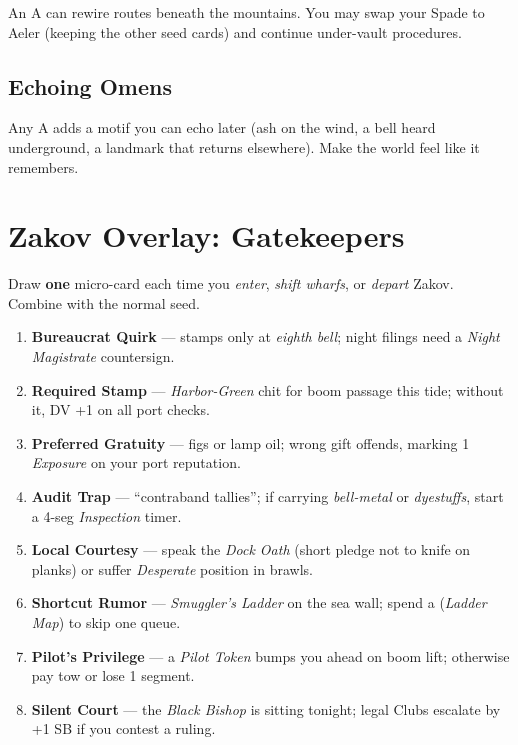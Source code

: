 \documentclass[11pt,letterpaper,twoside]{book}
\begin{document}
An A can rewire routes beneath the mountains. You may swap your Spade to Aeler (keeping the other seed cards) and continue under-vault procedures.

\subsection{Echoing Omens}

Any A adds a motif you can echo later (ash on the wind, a bell heard underground, a landmark that returns elsewhere). Make the world feel like it remembers.

\section{Zakov Overlay: Gatekeepers}

Draw \textbf{one} micro-card each time you \emph{enter}, \emph{shift wharfs}, or \emph{depart} Zakov. Combine with the normal seed.

\begin{tcolorbox}[enhanced,breakable,sharp corners,boxrule=.6pt,title={\textbf{Zakov Gatekeepers Micro-Cards (draw 1)}}]
\begin{enumerate}[label=\arabic*.]
  \item \textbf{Bureaucrat Quirk} --- stamps only at \emph{eighth bell}; night filings need a \emph{Night Magistrate} countersign.
  \item \textbf{Required Stamp} --- \emph{Harbor-Green} chit for boom passage this tide; without it, DV +1 on all port checks.
  \item \textbf{Preferred Gratuity} --- figs or lamp oil; wrong gift offends, marking 1 \emph{Exposure} on your port reputation.
  \item \textbf{Audit Trap} --- ``contraband tallies''; if carrying \emph{bell-metal} or \emph{dyestuffs}, start a 4-seg \emph{Inspection} timer.
  \item \textbf{Local Courtesy} --- speak the \emph{Dock Oath} (short pledge not to knife on planks) or suffer \emph{Desperate} position in brawls.
  \item \textbf{Shortcut Rumor} --- \emph{Smuggler's Ladder} on the sea wall; spend a \diamondsuit{} (\emph{Ladder Map}) to skip one queue.
  \item \textbf{Pilot's Privilege} --- a \emph{Pilot Token} bumps you ahead on boom lift; otherwise pay tow or lose 1 segment.
  \item \textbf{Silent Court} --- the \emph{Black Bishop} is sitting tonight; legal Clubs escalate by +1 SB if you contest a ruling.
\end{enumerate}
\end{tcolorbox}
\end{document}
